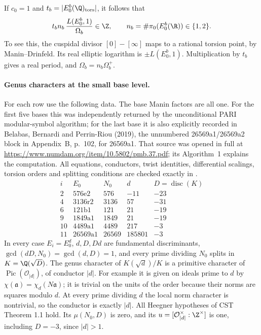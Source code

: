If $c_0=1$ and $t_b=|E_0^b(\Q)_{\rm tors}|$, it follows that
\[
 t_b n_b\,\frac{L(E_0^b,1)}{\Omega_b}\in\Z,
 \qquad n_b=\#\pi_0(E_0^b(\R))\in\{1,2\}.
\]
To see this, the cuspidal divisor $[0]-[\infty]$ maps to a rational
torsion point, by Manin--Drinfeld. Its real elliptic logarithm is
$\pm L(E_0^b,1)$. Multiplication by $t_b$ gives a real period, and
$\Omega_b=n_b\Omega_b^+$.

\paragraph{Genus characters at the small base level.}
For each row use the following data. The base Manin factors are all one. For the first five bases this was
independently returned by the unconditional PARI modular-symbol algorithm;
for the last base it is also explicitly recorded in Belabas, Bernardi and
Perrin-Riou (2019), the unnumbered 26569a1/26569a2 block in
Appendix~B, p.~102, for 26569a1. That source was opened in full
at \url{https://www.numdam.org/item/10.5802/pmb.37.pdf}; its Algorithm~1
explains the computation. All equations, conductors,
twist identities, differential scalings, torsion orders and splitting
conditions are checked exactly in .
\[
\begin{array}{c|c|r|r|r}
 i&E_0&N_0&d&D=\operatorname{disc}(K)\\\hline
 2&576\mathrm e2&576&-11&-23\\
 4&3136\mathrm r2&3136&57&-31\\
 6&121\mathrm b1&121&21&-19\\
 9&1849\mathrm a1&1849&21&-19\\
 10&4489\mathrm a1&4489&217&-3\\
 11&26569\mathrm a1&26569&185801&-3
\end{array}
\]
In every case $E_i=E_0^d$, $d,D,Dd$ are fundamental discriminants,
$\gcd(dD,N_0)=\gcd(d,D)=1$, and every prime dividing $N_0$ splits
in $K=\Q(\sqrt D)$. The genus character of
$K(\sqrt d)/K$ is a primitive character of
$\operatorname{Pic}(\mathcal O_{|d|})$, of conductor $|d|$.
For example it is given on ideals prime to $d$ by
$\chi(\mathfrak a)=\chi_d(N\mathfrak a)$; it is trivial on the
units of the order because their norms are squares modulo $d$.
At every prime dividing $d$ the local norm character is nontrivial,
so the conductor is exactly $|d|$. All Heegner hypotheses of CST
Theorem 1.1 hold. Its $\mu(N_0,D)$ is zero, and its
$u=[\mathcal O_{|d|}^\times:\Z^\times]$ is one, including
$D=-3$, since $|d|>1$.

